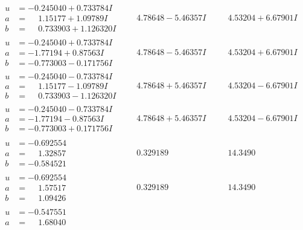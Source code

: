 \documentclass[1p]{elsarticle_modified}
\theoremstyle{definition}
\begin{document}
$$\begin{array}{c|c|c}
\begin{aligned}
u &= -0.245040 + 0.733784 I \\
a &= \phantom{-}1.15177 + 1.09789 I \\
b &= \phantom{-}0.733903 + 1.126320 I\end{aligned}
 & \phantom{-}4.78648 - 5.46357 I & \phantom{-}4.53204 + 6.67901 I \\ \hline\begin{aligned}
u &= -0.245040 + 0.733784 I \\
a &= -1.77194 + 0.87563 I \\
b &= -0.773003 - 0.171756 I\end{aligned}
 & \phantom{-}4.78648 - 5.46357 I & \phantom{-}4.53204 + 6.67901 I \\ \hline\begin{aligned}
u &= -0.245040 - 0.733784 I \\
a &= \phantom{-}1.15177 - 1.09789 I \\
b &= \phantom{-}0.733903 - 1.126320 I\end{aligned}
 & \phantom{-}4.78648 + 5.46357 I & \phantom{-}4.53204 - 6.67901 I \\ \hline\begin{aligned}
u &= -0.245040 - 0.733784 I \\
a &= -1.77194 - 0.87563 I \\
b &= -0.773003 + 0.171756 I\end{aligned}
 & \phantom{-}4.78648 + 5.46357 I & \phantom{-}4.53204 - 6.67901 I \\ \hline\begin{aligned}
u &= -0.692554\phantom{ +0.000000I} \\
a &= \phantom{-}1.32857\phantom{ +0.000000I} \\
b &= -0.584521\phantom{ +0.000000I}\end{aligned}
 & \phantom{-}0.329189\phantom{ +0.000000I} & \phantom{-}14.3490\phantom{ +0.000000I} \\ \hline\begin{aligned}
u &= -0.692554\phantom{ +0.000000I} \\
a &= \phantom{-}1.57517\phantom{ +0.000000I} \\
b &= \phantom{-}1.09426\phantom{ +0.000000I}\end{aligned}
 & \phantom{-}0.329189\phantom{ +0.000000I} & \phantom{-}14.3490\phantom{ +0.000000I} \\ \hline\begin{aligned}
u &= -0.547551\phantom{ +0.000000I} \\
a &= \phantom{-}1.68040\phantom{ +0.000000I} \\

\end{aligned}
\end{array}$$
\end{document}
